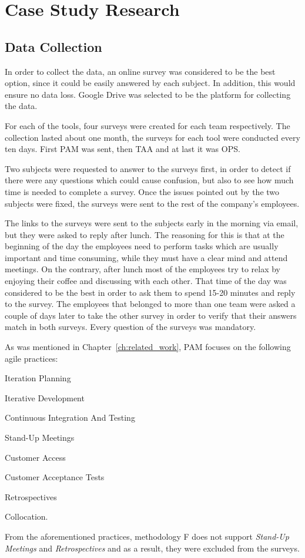 \section{Case Study Research}
\label{sec:case_study_research}

\subsection{Data Collection}
In order to collect the data, an online survey was considered to be the best option, since it could be easily answered by each subject. In addition, this would ensure no data loss. Google Drive\texttrademark \cite{google_drive} was selected to be the platform for collecting the data.

For each of the tools, four surveys were created for each team respectively. The collection lasted about one month, the surveys for each tool were conducted every ten days. First \ac{PAM} was sent, then \ac{TAA} and at last it was \ac{OPS}.

Two subjects were requested to answer to the surveys first, in order to detect if there were any questions which could cause confusion, but also to see how much time is needed to complete a survey. Once the issues pointed out by the two subjects were fixed, the surveys were sent to the rest of the company's employees.

The links to the surveys were sent to the subjects early in the morning via email, but they were asked to reply after lunch. The reasoning for this is that at the beginning of the day the employees need to perform tasks which are usually important and time consuming, while they must have a clear mind and attend meetings. On the contrary, after lunch most of the employees try to relax by enjoying their coffee and discussing with each other. That time of the day was considered to be the best in order to ask them to spend 15-20 minutes and reply to the survey. The employees that belonged to more than one team were asked a couple of days later to take the other survey in order to verify that their answers match in both surveys. Every question of the surveys was mandatory.

As was mentioned in Chapter~\ref{ch:related_work}, \ac{PAM} focuses on the following agile practices:
\begin{inparaenum} [a\upshape)]
	\item Iteration Planning
	\item Iterative Development
	\item Continuous Integration And Testing
	\item Stand-Up Meetings
	\item Customer Access
	\item Customer Acceptance Tests
	\item Retrospectives
	\item Collocation.
\end{inparaenum}
From the aforementioned practices, methodology F does not support \textit{Stand-Up Meetings} and \textit{Retrospectives} and as a result, they were excluded from the surveys.

